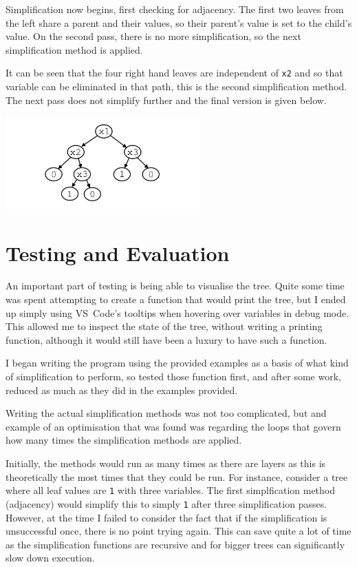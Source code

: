 \documentclass[12pt]{article}
\begin{document}
    Simplification now begins, first checking for adjacency. The first two leaves from the left share a parent and their values, so their parent's value is set to the child's value. On the second pass, there is no more simplification, so the next simplification method is applied.

    It can be seen that the four right hand leaves are independent of \texttt{x2} and so that variable can be eliminated  in that path, this is the second simplification method. The next pass does not simplify further and the final version is given below.
    \begin{center} \vspace{-3ex}
        \includegraphics[width=7.5cm, interpolate]{rsc/bt4.png}
        \parbox{\linewidth}{}
    \end{center}

    \newpage

    \section{Testing and Evaluation} \vspace{-3ex}
    An important part of testing is being able to visualise the tree. Quite some time was spent attempting to create a function that would print the tree, but I ended up simply using VS~Code's tooltips when hovering over variables in debug mode. This allowed me to inspect the state of the tree, without writing a printing function, although it would still have been a luxury to have such a function.

    I began writing the program using the provided examples as a basis of what kind of simplification to perform, so tested those function first, and after some work, reduced as much as they did in the examples provided.

    Writing the actual simplification methods was not too complicated, but and example of an optimisation that was found was regarding the loops that govern how many times the simplification methods are applied.

    Initially, the methods would run as many times as there are layers as this is theoretically the most times that they could be run. For instance, consider a tree where all leaf values are \texttt{1} with three variables. The first simplfication method (adjacency) would simplify this to simply \texttt{1} after three simplification passes. However, at the time I failed to consider the fact that if the simplification is unsuccessful once, there is no point trying again. This can save quite a lot of time as the simplification functions are recursive and for bigger trees can significantly slow down execution.
    
\end{document}
